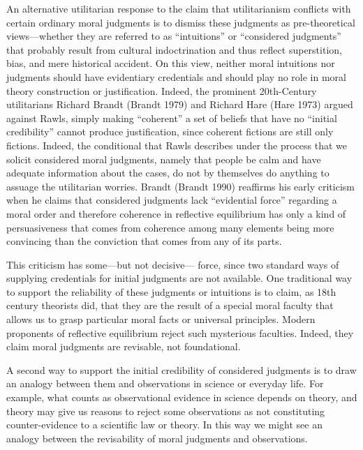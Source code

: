 \documentclass[]{article}
\begin{document}
An alternative utilitarian response to the claim that utilitarianism
conflicts with certain ordinary moral judgments is to dismiss these
judgments as pre-theoretical views---whether they are referred to as
``intuitions'' or ``considered judgments'' that probably result from
cultural indoctrination and thus reflect superstition, bias, and mere
historical accident. On this view, neither moral intuitions nor
judgments should have evidentiary credentials and should play no role in
moral theory construction or justification. Indeed, the prominent
20th-Century utilitarians Richard Brandt (Brandt 1979) and Richard Hare
(Hare 1973) argued against Rawls, simply making ``coherent'' a set of
beliefs that have no ``initial credibility'' cannot produce
justification, since coherent fictions are still only fictions. Indeed,
the conditional that Rawls describes under the process that we solicit
considered moral judgments, namely that people be calm and have adequate
information about the cases, do not by themselves do anything to assuage
the utilitarian worries. Brandt (Brandt 1990) reaffirms his early
criticism when he claims that considered judgments lack ``evidential
force'' regarding a moral order and therefore coherence in reflective
equilibrium has only a kind of persuasiveness that comes from coherence
among many elements being more convincing than the conviction that comes
from any of its parts.

This criticism has some---but not decisive--- force, since two standard
ways of supplying credentials for initial judgments are not available.
One traditional way to support the reliability of these judgments or
intuitions is to claim, as 18th century theorists did, that they are the
result of a special moral faculty that allows us to grasp particular
moral facts or universal principles. Modern proponents of reflective
equilibrium reject such mysterious faculties. Indeed, they claim moral
judgments are revisable, not foundational.

A second way to support the initial credibility of considered judgments
is to draw an analogy between them and observations in science or
everyday life. For example, what counts as observational evidence in
science depends on theory, and theory may give us reasons to reject some
observations as not constituting counter-evidence to a scientific law or
theory. In this way we might see an analogy between the revisability of
moral judgments and observations.
\end{document}
